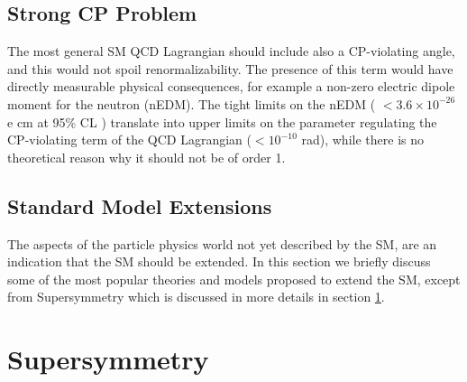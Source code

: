 \subsection*{Strong CP Problem}

The most general SM QCD Lagrangian should include also a CP-violating angle, and this would not spoil renormalizability. The presence of this term would have directly measurable physical consequences, for example a non-zero electric dipole moment for the neutron (nEDM). The tight  limits on the nEDM ( $< 3.6 \times 10^{-26}$ e cm at 95\% CL \cite{PhysRevD.92.092003}) translate into upper limits on the parameter regulating the CP-violating term of the QCD Lagrangian ($< 10^{-10}$ rad), while there is no theoretical reason why it should not be of order 1. 


\subsection{Standard Model Extensions}

The aspects of the particle physics world not yet described by the SM, are an indication that the SM should be extended.
In this section we briefly discuss some of the most popular theories and models proposed to extend the SM, except from Supersymmetry which is discussed in more details in section \ref{sec:smsusy:susy}.
\label{sec:sm:extensions}


\section{Supersymmetry}
\label{sec:smsusy:susy}

